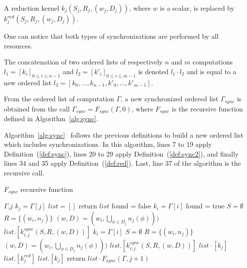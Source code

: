 \begin{mydef}
A reduction kernel $k_j(S_j,R_j,(w_j,D_j))$, where $w$ is a scalar, is replaced by $k^{red}_j(S_j,R_j,(w_j,D_j))$.
\label{def:red}
\end{mydef}

One can notice that both types of synchronizations are performed by all resources.

\begin{mydef}
The concatenation of two ordered lists of respectively $n$ and $m$ computations $l_1=[k_i]_{0 \leq i \leq n-1}$ and $l_2=[k'_i]_{0 \leq i \leq m-1}$ is denoted $l_1 \cdot l_2$ and is equal to a new ordered list $l_3=[k_0,\dots,k_{n-1},k'_0,\dots,k'_{m-1}]$.
\end{mydef}

\begin{mydef}
From the ordered list of computation $\Gamma$, a new synchronized ordered list $\Gamma_{sync}$ is obtained from the call $\Gamma_{sync} = F_{sync}(\Gamma,0)$, where $F_{sync}$ is the recursive function defined in Algorithm~\ref{alg:sync}.
\end{mydef}

Algorithm~\ref{alg:sync}~ follows the previous definitions to build a new ordered list which includes synchronizations. In this algorithm, lines 7 to 19 apply Definition~(\ref{def:sync}), lines 20 to 29 apply Definition~(\ref{def:sync2}), and finally lines 34 and 35 apply Definition~(\ref{def:red}). Last, line 37 of the algorithm is the recursive call.

\begin{algorithm}
\caption{$F_{sync}$ recursive function}
\label{alg:sync}
\begin{algorithmic}[1]
 {$\Gamma$,$j$}
\State $k_j = \Gamma[j]$
\State $list = []$
\State return $list$
\State found = false
\State $k_i = \Gamma[i]$
\State found = true
\State $S = \emptyset$
\State $R = \{(w_i,n_j)\}$
\State $(w,D) = (w_i,\bigcup_{\phi \in D_j} n_j(\phi)))$
\State $list.[k_{i;j}^{sync}(S,R,(w,D))]$%
\EndIf
\EndFor
{}
\State $k_i = \Gamma[i]$
\State $S = \emptyset$
\State $R = \{(w_i,n_j)\}$
\State $(w,D) = (w_i,\bigcup_{\phi \in D_j} n_j(\phi)))$
\State $list.[k_{i;j}^{sync}(S,R,(w,D))]$%
\EndIf
\EndFor
\EndIf
\State $list \cdot [k_j]$
\EndFor
{}
\State $list.[k^{red}_j]$
\Else
\State $list.[k_j]$
\EndIf
\State return $list \cdot F_{sync}(\Gamma,j+1)$
\EndProcedure
\end{algorithmic}
\end{algorithm}

